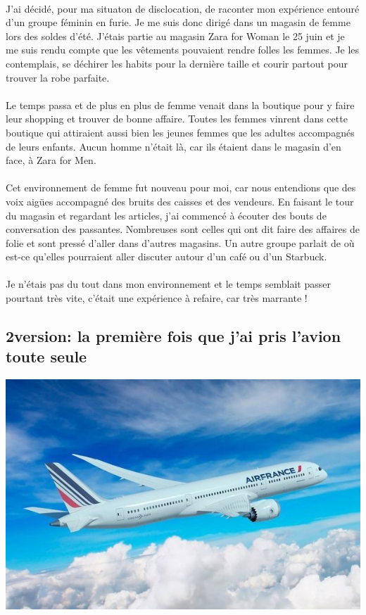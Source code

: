 \paragraph{}
J'ai décidé, pour ma situaton de disclocation, de raconter mon
expérience entouré d'un groupe féminin en furie. Je me suis donc
dirigé dans un magasin de femme lors des soldes d'été. J'étais partie
au magasin Zara for Woman le 25 juin et je me suis rendu compte que
les vêtements pouvaient rendre folles les femmes. Je les contemplais,
se déchirer les habits pour la dernière taille et courir partout pour
trouver la robe parfaite.
\paragraph{}
Le temps passa et de plus en plus de femme venait dans la boutique
pour y faire leur shopping et trouver de bonne affaire. Toutes les
femmes vinrent dans cette boutique qui attiraient aussi bien les jeunes
femmes que les adultes accompagnés de leurs enfants. Aucun homme
n'était là, car ils étaient dans le magasin d'en face, à Zara for Men.
\paragraph{}
Cet environnement de femme fut nouveau pour moi, car nous
entendions que des voix aigües accompagné des bruits des caisses et
des vendeurs. En faisant le tour du magasin et regardant les articles,
j'ai commencé à écouter des bouts de conversation des passantes.
Nombreuses sont celles qui ont dit faire des affaires de folie et sont
pressé d'aller dans d'autres magasins. Un autre groupe parlait de où
est-ce qu'elles pourraient aller discuter autour d'un café ou d'un
Starbuck.
\paragraph{}
Je n’étais pas du tout dans mon environnement et le temps semblait
passer pourtant très vite, c’était une expérience à refaire, car très
marrante !

\subsection{2\ieme version: la première fois que j’ai pris l’avion toute seule}
\begin{center}
\includegraphics[scale=0.7]{avion.jpg}
\end{center}
